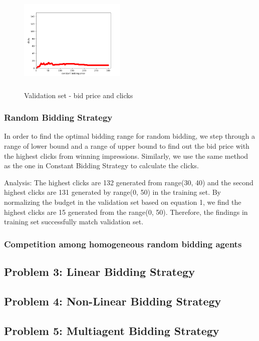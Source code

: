 \documentclass{sig-alternate-05-2015}
\begin{document}
\begin{figure}
\centering
\includegraphics[height=2in, width=2in]{report/constant_bidding_validation.png}
\caption{Validation set - bid price and clicks}
\end{figure}




\subsubsection{Random Bidding Strategy}
In order to find the optimal bidding range for random bidding, we step through a range of lower bound and a range of upper bound to find out the bid price with the highest clicks from winning impressions. Similarly, we use the same method as the one in Constant Bidding Strategy to calculate the clicks. 

Analysis: 
The highest clicks are 132 generated from range(30, 40) and the second highest clicks are 131 generated by range(0, 50) in the training set. By normalizing the budget in the validation set based on equation 1, we find the highest clicks are 15 generated from the range(0, 50). Therefore, the findings in training set successfully match validation set. 

\subsubsection{Competition among homogeneous random bidding agents}

\subsection{Problem 3: Linear Bidding Strategy}

\subsection{Problem 4: Non-Linear Bidding Strategy}

\subsection{Problem 5: Multiagent Bidding Strategy}
\end{document}
